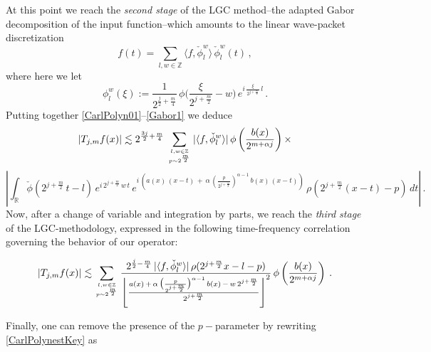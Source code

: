 \documentclass[a4paper,reqno]{amsart}
\numberwithin{equation}{section}
\theoremstyle{definition}
\newcommand{\R}{\mathbb{R}}
\newcommand{\Z}{\mathbb{Z}}
\def\a{\alpha}
\begin{document}
At this point we reach the \emph{second stage} of the LGC method--the adapted Gabor decomposition of the input function--which amounts to the linear wave-packet discretization
\begin{equation}\label{Gabor}
	f(t)=\sum_{l,w\in\Z} \langle f,  \check{\phi}_{l}^w\rangle\, \check{\phi}_{l}^w(t)\,,
\end{equation}
where here we let
\begin{equation}\label{Gabor1}
	\phi_{l}^w(\xi):=\frac{1}{2^{\frac{j}{2}+\frac{m}{4}}}\,\phi\Big(\frac{\xi}{2^{j+\frac{m}{2}}}-w\Big)\,
	e^{i\,\frac{\xi}{2^{j+\frac{m}{2}}}\,l}\,.
\end{equation}
Putting together \eqref{CarlPolyn01}--\eqref{Gabor1} we deduce
\begin{equation}\label{CarlPolynest}
\end{equation}
$$|T_{j,m} f(x)|\lesssim 2^{\frac{3j}{2}+\frac{m}{4}}\,\sum_{{l,w\in\Z}\atop{p\sim 2^{\frac{m}{2}}}} | \langle f,  \check{\phi}_{l}^w\rangle|\,\phi\left(\frac{b(x)}{2^{m+\a j}}\right)\times$$
$$\left|\int_{\R} \check{\phi}(2^{j+\frac{m}{2}}\,t-l)\,e^{i\,2^{j+\frac{m}{2}}\,w\,t}\,e^{i\,(a(x)\,(x-t)\,+\,\a\,\left(\frac{p}{2^{j+\frac{m}{2}}}\right)^{\a-1}\,b(x)\,(x-t))}\,
\rho(2^{j+\frac{m}{2}}(x-t)-p)\,dt\right|\,.$$
Now, after a change of variable and integration by parts, we reach the \emph{third stage} of the LGC-methodology, expressed in the following time-frequency correlation governing the behavior of our operator:

\begin{equation}\label{CarlPolynestKey}
	|T_{j,m} f(x)|\lesssim \sum_{{l,w\in\Z}\atop{p\sim 2^{\frac{m}{2}}}} \frac{2^{\frac{j}{2}-\frac{m}{4}}\,|\langle f,  \check{\phi}_{l}^w\rangle|\,\rho(2^{j+\frac{m}{2}}x-l-p)}
	{\left\lfloor\frac{a(x)\,+\,\a\,\big(\frac{p}{2^{j+\frac{m}{2}}}\big)^{\a-1}\,b(x)\,-\,w\,2^{j+\frac{m}{2}}}{2^{j+\frac{m}{2}}}\right\rfloor^2}\,
	\phi\left(\frac{b(x)}{2^{m+\a j}}\right)\:.
\end{equation}

Finally, one can remove the presence of the $p-$parameter by rewriting \eqref{CarlPolynestKey} as
\end{document}
